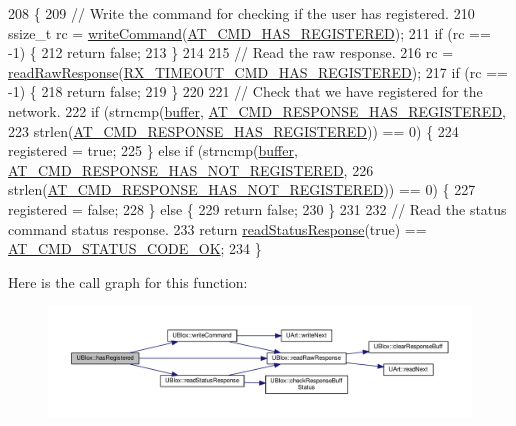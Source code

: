 \begin{DoxyCode}
208 \{
209     \textcolor{comment}{// Write the command for checking if the user has registered.}
210     ssize\_t rc = \hyperlink{class_u_blox_af604d1897a66192bf1c2a11997f2634d}{writeCommand}(\hyperlink{_u_blox_8cpp_adb3c30885c8e5a7fa3028c3c33ff46a7}{AT\_CMD\_HAS\_REGISTERED});
211     \textcolor{keywordflow}{if} (rc == -1) \{
212         \textcolor{keywordflow}{return} \textcolor{keyword}{false};
213     \}
214 
215     \textcolor{comment}{// Read the raw response.}
216     rc = \hyperlink{class_u_blox_ab4a7ab4b8922d91e23f273ae160c1bed}{readRawResponse}(\hyperlink{_u_blox_8cpp_a4cdcbb86e4e627adbcaf6ce6c5a7a07a}{RX\_TIMEOUT\_CMD\_HAS\_REGISTERED});
217     \textcolor{keywordflow}{if} (rc == -1) \{
218         \textcolor{keywordflow}{return} \textcolor{keyword}{false};
219     \}
220 
221     \textcolor{comment}{// Check that we have registered for the network.}
222     \textcolor{keywordflow}{if} (strncmp(\hyperlink{class_u_blox_a6ca4b90f3dc4e856181dce1ebda6f82c}{buffer}, \hyperlink{_u_blox_8cpp_a7992f1bd61ccf8e78586835e17c1b8e5}{AT\_CMD\_RESPONSE\_HAS\_REGISTERED},
223                 strlen(\hyperlink{_u_blox_8cpp_a7992f1bd61ccf8e78586835e17c1b8e5}{AT\_CMD\_RESPONSE\_HAS\_REGISTERED})) == 0) \{
224         registered = \textcolor{keyword}{true};
225     \} \textcolor{keywordflow}{else} \textcolor{keywordflow}{if} (strncmp(\hyperlink{class_u_blox_a6ca4b90f3dc4e856181dce1ebda6f82c}{buffer}, \hyperlink{_u_blox_8cpp_a10b9369ebc46aa9cca83e01af5ebd741}{AT\_CMD\_RESPONSE\_HAS\_NOT\_REGISTERED},
226                        strlen(\hyperlink{_u_blox_8cpp_a10b9369ebc46aa9cca83e01af5ebd741}{AT\_CMD\_RESPONSE\_HAS\_NOT\_REGISTERED})) == 0) 
      \{
227         registered = \textcolor{keyword}{false};
228     \} \textcolor{keywordflow}{else} \{
229         \textcolor{keywordflow}{return} \textcolor{keyword}{false};
230     \}
231 
232     \textcolor{comment}{// Read the status command status response.}
233     \textcolor{keywordflow}{return} \hyperlink{class_u_blox_a4eaca5b1b1c4b5b6f6164b220dd43e0b}{readStatusResponse}(\textcolor{keyword}{true}) == \hyperlink{_u_blox_8cpp_a6ebc1682eb6b9964fccb4a61688ff307}{AT\_CMD\_STATUS\_CODE\_OK};
234 \}
\end{DoxyCode}
Here is the call graph for this function\+:
\nopagebreak
\begin{figure}[H]
\begin{center}
\leavevmode
\includegraphics[width=350pt]{da/df6/class_u_blox_a1889c2b9bb6087bc939bd2a27b68623b_cgraph}
\end{center}
\end{figure}
